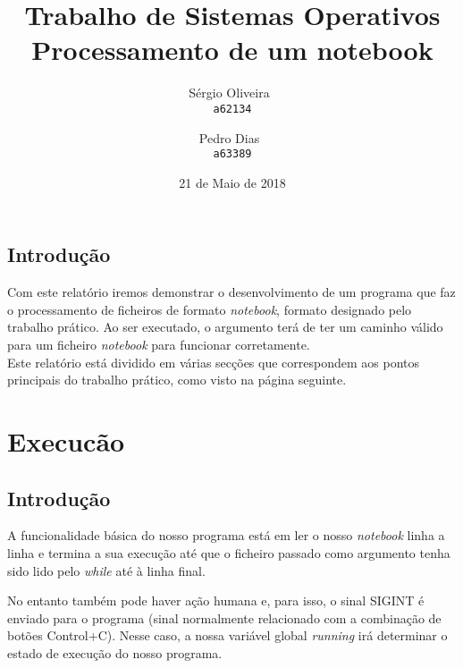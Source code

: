 \documentclass[11pt,twoside,a4paper]{report}
\begin{document}
\title{Trabalho de Sistemas Operativos\\Processamento de um notebook}
\author{
   Sérgio Oliveira~\\
   \texttt{a62134}
   \and
   Pedro Dias~\\
   \texttt{a63389}
}
\date{21 de Maio de 2018}
\maketitle
\raggedbottom
\pagebreak
\pagebreak
\section{Introdução}
Com este relatório iremos demonstrar o desenvolvimento de um programa que faz o processamento de ficheiros de formato \textit{notebook}, formato designado pelo trabalho prático. Ao ser executado, o argumento terá de ter um caminho válido para um ficheiro \textit{notebook} para funcionar corretamente. ~\\
Este relatório está dividido em várias secções que correspondem aos pontos principais do trabalho prático, como visto na página seguinte.

\pagebreak
\tableofcontents


\chapter{Execucão}

\section{Introdução}

A funcionalidade básica do nosso programa está em ler o nosso \textit{notebook} linha a linha e termina a sua execução até que o ficheiro passado como argumento tenha sido lido pelo \textit{while} até à linha final.


No entanto também pode haver ação humana e, para isso, o sinal SIGINT é enviado para o programa (sinal normalmente relacionado com a combinação de botões Control+C).
Nesse caso, a nossa variável global \textit{running} irá determinar o estado de execução do nosso programa.


\end{document}

